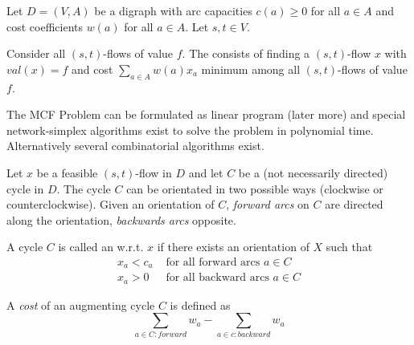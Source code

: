 \begin{lec}[2011-12-08]\end{lec}

\begin{defn}
Let $D = (V, A)$ be a digraph with arc capacities $c(a) \geq 0$ for all $a
\in A$ and cost coefficients $w(a)$ for all $a \in A$. Let $s, t \in V$.

Consider all $(s, t)$-flows of value $f$. The  consists of finding a
$(s,t)$-flow $x$ with $val(x) = f$ and cost $\sum_{a \in A} w(a) x_a$
minimum among all $(s,t)$-flows of value $f$.
\end{defn}

The MCF Problem can be formulated as linear program (later more) and special
network-simplex algorithms exist to solve the problem in polynomial time.
Alternatively several combinatorial algorithms exist.

\begin{defn}
Let $x$ be a feasible $(s,t)$-flow in $D$ and let $C$ be a (not necessarily
directed) cycle in $D$. The cycle $C$ can be orientated in two possible ways
(clockwise or counterclockwise). Given an orientation of $C$, \emph{forward
arcs} on $C$ are directed along the orientation, \emph{backwards arcs} opposite.

A cycle $C$ is called an  w.r.t. $x$ if there exists an
orientation of $X$ such that
\begin{align*}
x_a < c_a & \text{ for all forward arcs } a \in C \\
x_a > 0	& \text{ for all backward arcs } a \in C
\end{align*}
\end{defn}

\begin{defn}
A \emph{cost} of an augmenting cycle $C$ is defined as
\[
\sum_{a \in C: forward} w_a - \sum_{a \in c: backward} w_a
\]
\end{defn}


